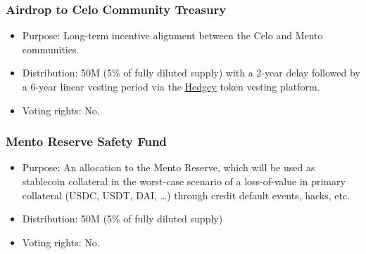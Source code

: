 \documentclass[a4paper]{article}
\theoremstyle{definition}
\begin{document}
\subsubsection*{Airdrop to Celo Community Treasury}
\begin{itemize}
    \item Purpose: Long-term incentive alignment between the Celo and Mento communities.
    \item Distribution: 50M (5\% of fully diluted supply) with a 2-year delay followed by a 6-year linear vesting period via the \href{https://hedgey.finance/}{Hedgey} token vesting platform.
    \item Voting rights: No.
\end{itemize}

\subsubsection*{Mento Reserve Safety Fund}
\begin{itemize}
    \item Purpose: An allocation to the Mento Reserve, which will be used as stablecoin collateral in the worst-case scenario of a loss-of-value in primary collateral (USDC, USDT, DAI, …) through credit default events, hacks, etc. 
    \item Distribution: 50M (5\% of fully diluted supply)
    \item Voting rights: No.
\end{itemize}
\end{document}
